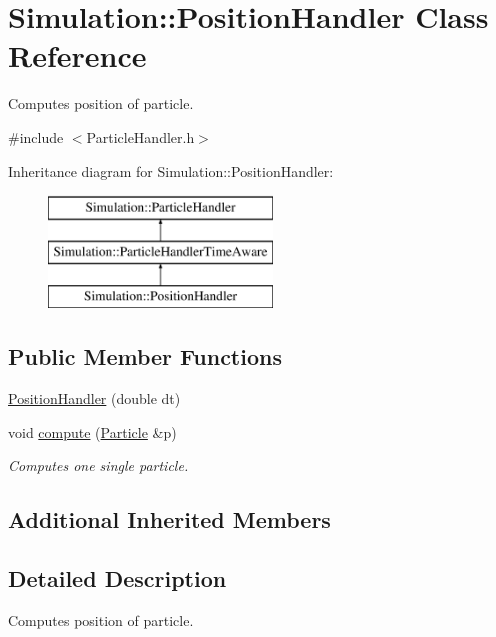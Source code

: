 \hypertarget{classSimulation_1_1PositionHandler}{\section{Simulation\-:\-:Position\-Handler Class Reference}
\label{classSimulation_1_1PositionHandler}
}


Computes position of particle.  




{\ttfamily \#include $<$Particle\-Handler.\-h$>$}

Inheritance diagram for Simulation\-:\-:Position\-Handler\-:\begin{figure}[H]
\begin{center}
\leavevmode
\includegraphics[height=3.000000cm]{classSimulation_1_1PositionHandler}
\end{center}
\end{figure}
\subsection*{Public Member Functions}
\begin{DoxyCompactItemize}
\item 
\hyperlink{classSimulation_1_1PositionHandler_ab66e6345c9e20bae0fc297253e4f6f5f}{Position\-Handler} (double dt)
\item 
void \hyperlink{classSimulation_1_1PositionHandler_adfd177c32d7c11827ae6556ee6dd7602}{compute} (\hyperlink{classSimulation_1_1Particle}{Particle} \&p)
\begin{DoxyCompactList}\small\item\em Computes one single particle. \end{DoxyCompactList}\end{DoxyCompactItemize}
\subsection*{Additional Inherited Members}


\subsection{Detailed Description}
Computes position of particle. 

